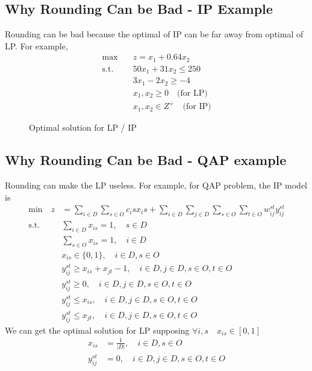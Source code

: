 			\subsection{Why Rounding Can be Bad - IP Example}
				Rounding can be bad because the optimal of IP can be far away from optimal of LP. For example,
				\begin{align}
					\text{max} \quad & z=x_1 +0.64x_2  \\
					\text{s.t.} \quad & 50x_1 +31x_2 \le 250  \\
								& 3x_1-2x_2\ge -4  \\
								& x_1,x_2\ge 0 \quad \text{(for LP)}\\
								& x_1,x_2 \in Z^+ \quad \text{(for IP)} 
				\end{align}
				\begin{figure}[h!]
					\centering
					\caption{Optimal solution for LP / IP}
				\end{figure}

			\subsection{Why Rounding Can be Bad - QAP example}
				Rounding can make the LP useless. For example, for QAP problem, the IP model is
				\begin{align}
					\text{min} \quad z &= \sum_{i\in D} \sum_{s\in O} c_is x_is + \sum_{i\in D} \sum_{j \in D} \sum_{s \in O} \sum_{t\in O} w_{ij}^{st}y_{ij}^{st}  \\
					\text{s.t.} \quad & \sum_{i \in D} x_{is} =1, \quad s\in D  \\
								&\sum_{s \in O} x_{is} = 1, \quad i \in D  \\
								&x_{is} \in \{0, 1\}, \quad i \in D, s\in O  \\
								& y_{ij}^{st} \ge x_{is} + x_{jt} - 1, \quad i\in D, j\in D, s\in O, t \in O  \\
								& y_{ij}^{st} \ge 0, \quad i\in D, j\in D, s\in O, t \in O  \\
								& y_{ij}^{st} \le x_{is}, \quad i\in D, j\in D, s\in O, t \in O  \\
								& y_{ij}^{st} \le x_{jt}, \quad i\in D, j\in D, s\in O, t \in O  
				\end{align}
				We can get the optimal solution for LP supposing $\forall i, s \quad x_{is}\in [0, 1]$
				\begin{align}
					x_{is} &= \frac{1}{|D|}, \quad i \in D, s\in O   \\
					y_{ij}^{st} & = 0, \quad i\in D, j\in D, s\in O, t \in O 
				\end{align}
				
